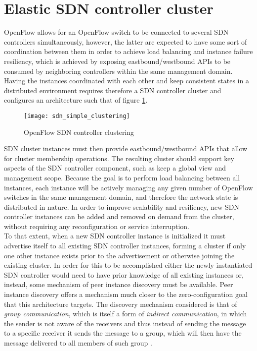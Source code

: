 \section{Elastic SDN controller cluster}
\label{section:SDN-controller-cluster}
OpenFlow allows for an OpenFlow switch to be connected to several \gls{SDN} controllers simultaneously, however, the latter are expected to have some sort of coordination between them in order to achieve load balancing and instance failure resiliency, which is achieved by exposing eastbound/westbound \glspl{API} to be consumed by neighboring controllers within the same management domain.
%
Having the instances coordinated with each other and keep consistent states in a distributed environment requires therefore a \gls{SDN} controller cluster and configures an architecture such that of figure \ref{fig:sdn_simple_clustering}.\\
%
\begin{figure}
	\centering
	\texttt{[image: sdn\_simple\_clustering]}
	\caption{OpenFlow SDN controller clustering}
	\label{fig:sdn_simple_clustering}
\end{figure}
%
\gls{SDN} cluster instances must then provide eastbound/westbound \glspl{API} that allow for cluster membership operations.
The resulting cluster should support key aspects of the \gls{SDN} controller component, such as keep a global view and management scope.
Because the goal is to perform load balancing between all instances, each instance will be actively managing any given number of OpenFlow switches in the same management domain, and therefore the network state is distributed in nature.
In order to improve scalability and resiliency, new \gls{SDN} controller instances can be added and removed on demand from the cluster, without requiring any reconfiguration or service interruption.\\
%
To that extent, when a new \gls{SDN} controller instance is initialized it must advertise itself to all existing \gls{SDN} controller instances, forming a cluster if only one other instance exists prior to the advertisement or otherwise joining the existing cluster.
In order for this to be accomplished either the newly instantiated \gls{SDN} controller would need to have prior knowledge of all existing instances or, instead, some mechanism of peer instance discovery must be available.
Peer instance discovery offers a mechanism much closer to the zero-configuration goal that this architecture targets.
The discovery mechanism considered is that of \emph{group communication}, which is itself a form of \emph{indirect communication}, in which the sender is not aware of the receivers and thus instead of sending the message to a specific receiver it sends the message to a group, which will then have the message delivered to all members of such group \cite{PADI}.\\
